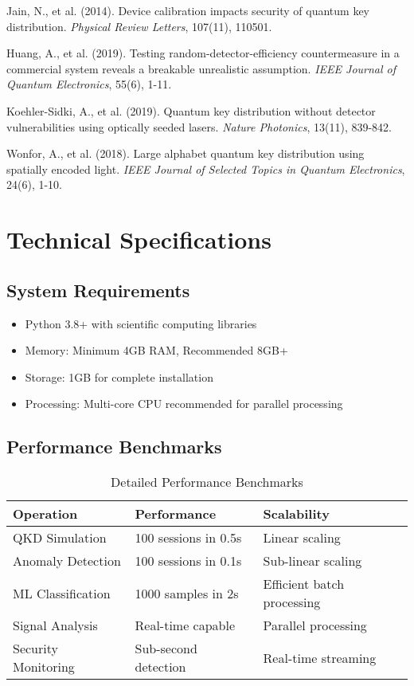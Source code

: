 \documentclass[12pt,a4paper]{article}
\begin{document}
\begin{thebibliography}{15}
Jain, N., et al. (2014). Device calibration impacts security of quantum key distribution. \textit{Physical Review Letters}, 107(11), 110501.

Huang, A., et al. (2019). Testing random-detector-efficiency countermeasure in a commercial system reveals a breakable unrealistic assumption. \textit{IEEE Journal of Quantum Electronics}, 55(6), 1-11.

Koehler-Sidki, A., et al. (2019). Quantum key distribution without detector vulnerabilities using optically seeded lasers. \textit{Nature Photonics}, 13(11), 839-842.

Wonfor, A., et al. (2018). Large alphabet quantum key distribution using spatially encoded light. \textit{IEEE Journal of Selected Topics in Quantum Electronics}, 24(6), 1-10.

\end{thebibliography}

\appendix

\section{Technical Specifications}

\subsection{System Requirements}
\begin{itemize}
    \item Python 3.8+ with scientific computing libraries
    \item Memory: Minimum 4GB RAM, Recommended 8GB+
    \item Storage: 1GB for complete installation
    \item Processing: Multi-core CPU recommended for parallel processing
\end{itemize}

\subsection{Performance Benchmarks}
\begin{table}[H]
\centering
\caption{Detailed Performance Benchmarks}
\begin{tabular}{@{}lll@{}}
\toprule
\textbf{Operation} & \textbf{Performance} & \textbf{Scalability} \\
\midrule
QKD Simulation & 100 sessions in 0.5s & Linear scaling \\
Anomaly Detection & 100 sessions in 0.1s & Sub-linear scaling \\
ML Classification & 1000 samples in 2s & Efficient batch processing \\
Signal Analysis & Real-time capable & Parallel processing \\
Security Monitoring & Sub-second detection & Real-time streaming \\
\bottomrule
\end{tabular}
\end{table}
\end{document}
